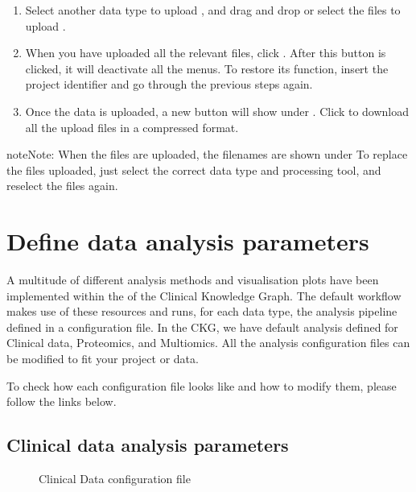 \documentclass[letterpaper,10pt,english]{sphinxmanual}
\let\sphinxpxdimen\pdfpxdimen\else\newdimen\sphinxpxdimen
\begin{document}
\begin{enumerate}
%
\item {} 
Select another data type to upload , and drag and drop or select the files to upload .

\item {} 
When you have uploaded all the relevant files, click  . After this button is clicked, it will deactivate all the menus. To restore its function, insert the project identifier and go through the previous steps again.

\item {} 
Once the data is uploaded, a new button will show under . Click  to download all the upload files in a compressed format.

\end{enumerate}

\begin{sphinxadmonition}{note}{Note:}
When the files are uploaded, the filenames are shown under 
To replace the files uploaded, just select the correct data type and processing tool, and reselect the files again.
\end{sphinxadmonition}


\section{Define data analysis parameters}
\label{\detokenize{getting_started/data-analysis-config:define-data-analysis-parameters}}\label{\detokenize{getting_started/data-analysis-config::doc}}
A multitude of different analysis methods and visualisation plots have been implemented within the  of the Clinical Knowledge Graph.
The default workflow makes use of these resources and runs, for each data type, the analysis pipeline defined in a configuration file. In the CKG, we have
default analysis defined for Clinical data, Proteomics, and Multiomics. All the analysis configuration files can be modified to fit your project or data.

To check how each configuration file looks like and how to modify them, please follow the links below.


\subsection{Clinical data analysis parameters}
\label{\detokenize{getting_started/data_settings/clinical-data:clinical-data-analysis-parameters}}\label{\detokenize{getting_started/data_settings/clinical-data:clinical-data-conf-file}}\label{\detokenize{getting_started/data_settings/clinical-data::doc}}\begin{wrapfigure}{r}{350\sphinxpxdimen}
\centering
\noindent\sphinxincludegraphics[width=350\sphinxpxdimen]{{clinical_config}.png}
\caption{Clinical Data configuration file}\label{\detokenize{getting_started/data_settings/clinical-data:id1}}\end{wrapfigure}
\end{document}
